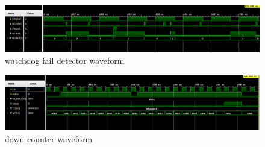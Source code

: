 \documentclass[10pt]{report}
\begin{document}
\begin{figure}[h]
\includegraphics[width=\textwidth,height=\textwidth,keepaspectratio]{wd_fail_detector.png}
\caption{watchdog fail detector waveform}
\end{figure}

\begin{figure}[h]
\includegraphics[width=\textwidth,height=\textwidth,keepaspectratio]{down_counter.png}
\caption{down counter waveform}
\end{figure}
\end{document}
